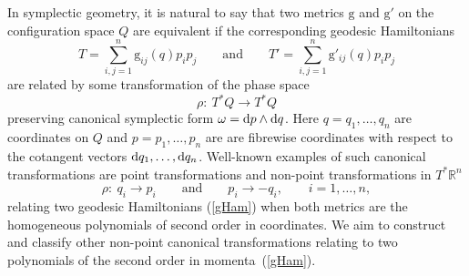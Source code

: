 \documentclass[pdftex]{sigma}
\numberwithin{equation}{section}
\begin{document}
In symplectic geometry, it is natural to say that two metrics $\mathrm g$ and $\mathrm g'$ on the configuration space $Q$ are equivalent if the corresponding geodesic Hamiltonians
\begin{equation} \label{gHam}
T=\sum_{i,j=1}^n \mathrm g_{ij}(q) p_ip_j\qquad \mbox{and}\qquad
T'=\sum_{i,j=1}^n \mathrm g'_{ij}(q) p_ip_j
\end{equation}
are related by some transformation of the phase space
\begin{equation}\label{g-trans}
\rho\colon \  T^*Q\to T^*Q
\end{equation}
preserving canonical symplectic form $\omega={\rm d}p\wedge {\rm d}q$. Here $q=q_1,\dots,q_n$ are coordinates on $Q$ and $p=p_1,\dots,p_n$ are
are fibrewise coordinates with respect to the cotangent vectors ${\rm d}q_1,\dots,{\rm d}q_n$.
Well-known examples of such canonical transformations are point transformations and non-point transformations in $T^*{\mathbb R}^n$
\[
\rho\colon \ q_i\to p_i\qquad\mbox{and}\qquad p_i\to -q_i ,\qquad i=1,\dots,n ,
\]
relating two geodesic Hamiltonians (\ref{gHam}) when both metrics are the homogeneous polynomials of second order in coordinates.
We aim to construct and classify other non-point canonical transformations relating to two polynomials of the second order in momenta~(\ref{gHam}).
\end{document}
